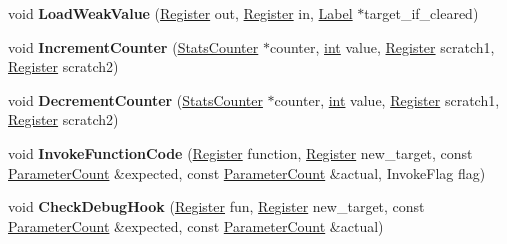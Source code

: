 \begin{DoxyCompactItemize}
\item 
\mbox{\label{classv8_1_1internal_1_1MacroAssembler_ab142a904bdb8e7d16e762655774c5284}} 
void {\bfseries Load\+Weak\+Value} (\mbox{\hyperlink{classv8_1_1internal_1_1Register}{Register}} out, \mbox{\hyperlink{classv8_1_1internal_1_1Register}{Register}} in, \mbox{\hyperlink{classv8_1_1internal_1_1Label}{Label}} $\ast$target\+\_\+if\+\_\+cleared)
\item 
\mbox{\label{classv8_1_1internal_1_1MacroAssembler_a7a18bd522429bd7c7f20cd2a4325249d}} 
void {\bfseries Increment\+Counter} (\mbox{\hyperlink{classv8_1_1internal_1_1StatsCounter}{Stats\+Counter}} $\ast$counter, \mbox{\hyperlink{classint}{int}} value, \mbox{\hyperlink{classv8_1_1internal_1_1Register}{Register}} scratch1, \mbox{\hyperlink{classv8_1_1internal_1_1Register}{Register}} scratch2)
\item 
\mbox{\label{classv8_1_1internal_1_1MacroAssembler_a989b426fe1ff4cb41c77b21f849fb370}} 
void {\bfseries Decrement\+Counter} (\mbox{\hyperlink{classv8_1_1internal_1_1StatsCounter}{Stats\+Counter}} $\ast$counter, \mbox{\hyperlink{classint}{int}} value, \mbox{\hyperlink{classv8_1_1internal_1_1Register}{Register}} scratch1, \mbox{\hyperlink{classv8_1_1internal_1_1Register}{Register}} scratch2)
\item 
\mbox{\label{classv8_1_1internal_1_1MacroAssembler_a45a3612fb3be7000eb94309ac385674b}} 
void {\bfseries Invoke\+Function\+Code} (\mbox{\hyperlink{classv8_1_1internal_1_1Register}{Register}} function, \mbox{\hyperlink{classv8_1_1internal_1_1Register}{Register}} new\+\_\+target, const \mbox{\hyperlink{classv8_1_1internal_1_1ParameterCount}{Parameter\+Count}} \&expected, const \mbox{\hyperlink{classv8_1_1internal_1_1ParameterCount}{Parameter\+Count}} \&actual, Invoke\+Flag flag)
\item 
\mbox{\label{classv8_1_1internal_1_1MacroAssembler_a2cf2b9ab50d1b6efcd90587f2502451b}} 
void {\bfseries Check\+Debug\+Hook} (\mbox{\hyperlink{classv8_1_1internal_1_1Register}{Register}} fun, \mbox{\hyperlink{classv8_1_1internal_1_1Register}{Register}} new\+\_\+target, const \mbox{\hyperlink{classv8_1_1internal_1_1ParameterCount}{Parameter\+Count}} \&expected, const \mbox{\hyperlink{classv8_1_1internal_1_1ParameterCount}{Parameter\+Count}} \&actual)

\end{DoxyCompactItemize}
